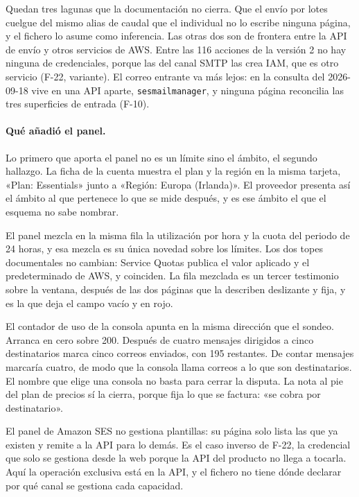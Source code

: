 Quedan tres lagunas que la documentación no cierra. Que el envío por lotes
cuelgue del mismo alias de caudal que el individual no lo escribe ninguna
página, y el fichero lo asume como inferencia. Las otras dos son de frontera entre la
API de envío y otros servicios de AWS. Entre
las 116 acciones de la versión 2 no hay
ninguna de credenciales, porque las del canal SMTP las crea IAM, que es otro
servicio (F-22, variante). El correo entrante va más lejos: en la consulta del 2026-09-18 vive en una
API aparte, \texttt{sesmailmanager}, y ninguna página reconcilia las tres
superficies de entrada (F-10).

\paragraph{Qué añadió el panel.} Lo primero que aporta el panel no es un
límite sino el ámbito, el segundo hallazgo. La ficha de la cuenta muestra el plan y la región en la
misma tarjeta, «Plan: Essentials» junto a «Región: Europa (Irlanda)». El
proveedor presenta así el ámbito al que pertenece lo que se mide después, y es
ese ámbito el que el esquema no sabe nombrar.

El panel mezcla en la misma fila la utilización por hora y la cuota del
periodo de 24 horas, y esa mezcla es su única novedad sobre los límites. Los
dos topes documentales no cambian: Service Quotas publica el valor aplicado
y el predeterminado de AWS, y coinciden. La fila mezclada es un tercer
testimonio sobre la ventana, después de las dos páginas que la describen
deslizante y fija, y es la que deja el campo vacío y en rojo.

El contador de uso de la consola apunta en la misma dirección que el sondeo.
Arranca en cero sobre 200. Después de cuatro mensajes dirigidos a cinco
destinatarios marca cinco correos enviados, con 195 restantes. De contar
mensajes marcaría cuatro, de modo que la consola llama correos a lo que son
destinatarios. El nombre que elige una consola no basta para cerrar la
disputa. La nota al pie del plan de precios sí la cierra, porque fija lo que
se factura: «se cobra por destinatario».

El panel de Amazon SES no gestiona plantillas: su página solo lista las que
ya existen y remite a la API para lo demás. Es el caso inverso de F-22, la
credencial que solo se gestiona desde la web porque la API del producto no
llega a tocarla. Aquí la operación exclusiva está en la API, y el fichero no tiene dónde
declarar por qué canal se gestiona cada capacidad.


